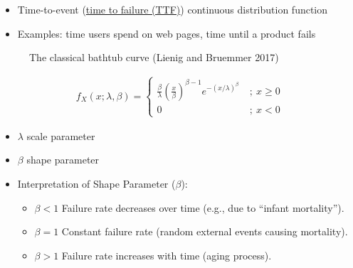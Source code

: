 \documentclass[
  a4paper,
]{scrbook}
\providecommand{\tightlist}{%
  \setlength{\itemsep}{0pt}\setlength{\parskip}{0pt}}\usepackage{longtable,booktabs,array}
\begin{document}
\begin{itemize}
\tightlist
\item
  Time-to-event (\hyperref[TTF]{time to failure (TTF)}) continuous
  distribution function
\item
  Examples: time users spend on web pages, time until a product fails
\end{itemize}

\begin{figure}[ht]


\caption{\label{fig-bathtub}The classical bathtub curve (Lienig and
Bruemmer 2017)}

\end{figure}%

\begin{align}
f_X(x; \lambda, \beta) = \left\{ \begin{array}{cl}
    \frac{\beta}{\lambda}(\frac{x}{\beta})^{\beta-1} e^{-(x/\lambda)^\beta} & \ ; \ x \geq 0 \\
    0 & \ ; \ x < 0 \end{array} \right. 
\end{align}

\begin{itemize}
\tightlist
\item
  \(\lambda\) scale parameter
\item
  \(\beta\) shape parameter
\item
  Interpretation of Shape Parameter (\(\beta\)):

  \begin{itemize}
  \tightlist
  \item
    \(\beta < 1\) Failure rate decreases over time (e.g., due to
    ``infant mortality'').
  \item
    \(\beta = 1\) Constant failure rate (random external events causing
    mortality).
  \item
    \(\beta > 1\) Failure rate increases with time (aging process).
  \end{itemize}
\end{itemize}
\end{document}
